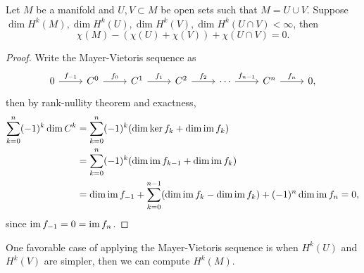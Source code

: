 \begin{corollary}\label{cor:mv_euler_char}
    Let \(M\) be a manifold and \(U,V\subset M\) be open sets such that \(M = U\cup V\). Suppose \(\dim H^k(M), \dim H^k(U), \dim H^k(V), \dim H^k(U\cap V)<\infty\), then \[
        \chi(M) - (\chi(U) + \chi(V)) + \chi(U\cap V) = 0.
    \]
\end{corollary}
\begin{proof}
    Write the Mayer-Vietoris sequence as \[
        \begin{tikzcd}
            0 \ar{r}{f_{-1}} & C^0 \ar{r}{f_0} & C^1 \ar{r}{f_1} & C^2 \ar{r}{f_2} & \cdots \ar{r}{f_{n-1}} & C^n \ar{r}{f_n} & 0,
        \end{tikzcd}
    \] then by rank-nullity theorem and exactness, \begin{align*}
        \sum_{k=0}^n (-1)^k\dim C^k
        &= \sum_{k=0}^n (-1)^k(\dim\ker f_k + \dim\operatorname{im} f_k) \\
        &= \sum_{k=0}^n (-1)^k(\dim\operatorname{im} f_{k-1} + \dim\operatorname{im} f_k) \\
        &= \dim\operatorname{im} f_{-1} + \sum_{k=0}^{n-1} (\dim\operatorname{im} f_k - \dim\operatorname{im} f_k) + (-1)^n\dim\operatorname{im} f_n = 0,
    \end{align*} since \(\operatorname{im} f_{-1} = 0 = \operatorname{im} f_n\).
\end{proof}

One favorable case of applying the Mayer-Vietoris sequence is when \(H^k(U)\) and \(H^k(V)\) are simpler, then we can compute \(H^k(M)\).

